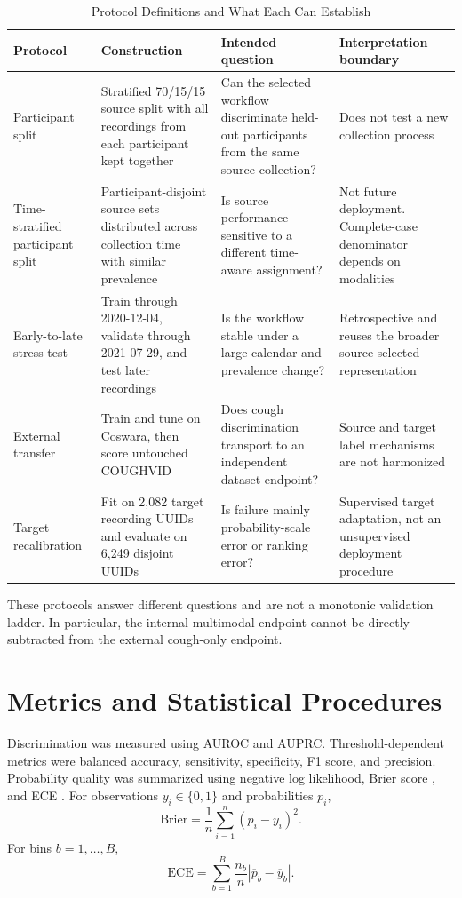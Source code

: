 \documentclass[journal]{IEEEtran}
\newcommand{\ece}{\mathrm{ECE}}
\begin{document}
\begin{table}[t]
\caption{Protocol Definitions and What Each Can Establish}
\label{tab:s_protocols}
\centering
\footnotesize
\begin{tabular}{L{2.6cm}L{3.7cm}L{3.4cm}L{3.8cm}}
\toprule
Protocol & Construction & Intended question & Interpretation boundary \\
\midrule
Participant split & Stratified 70/15/15 source split with all recordings from each participant kept together & Can the selected workflow discriminate held-out participants from the same source collection? & Does not test a new collection process \\
Time-stratified participant split & Participant-disjoint source sets distributed across collection time with similar prevalence & Is source performance sensitive to a different time-aware assignment? & Not future deployment. Complete-case denominator depends on modalities \\
Early-to-late stress test & Train through 2020-12-04, validate through 2021-07-29, and test later recordings & Is the workflow stable under a large calendar and prevalence change? & Retrospective and reuses the broader source-selected representation \\
External transfer & Train and tune on Coswara, then score untouched COUGHVID & Does cough discrimination transport to an independent dataset endpoint? & Source and target label mechanisms are not harmonized \\
Target recalibration & Fit on 2,082 target recording UUIDs and evaluate on 6,249 disjoint UUIDs & Is failure mainly probability-scale error or ranking error? & Supervised target adaptation, not an unsupervised deployment procedure \\
\bottomrule
\end{tabular}
\end{table}

These protocols answer different questions and are not a monotonic validation ladder. In particular, the internal multimodal endpoint cannot be directly subtracted from the external cough-only endpoint.

\section{Metrics and Statistical Procedures}

Discrimination was measured using AUROC and AUPRC. Threshold-dependent metrics were balanced accuracy, sensitivity, specificity, F1 score, and precision. Probability quality was summarized using negative log likelihood, Brier score \cite{brier1950verification}, and ECE \cite{vancalster2019calibration}. For observations $y_i\in\{0,1\}$ and probabilities $p_i$,
\begin{equation}
\mathrm{Brier}=\frac{1}{n}\sum_{i=1}^{n}(p_i-y_i)^2.
\end{equation}
For bins $b=1,\ldots,B$,
\begin{equation}
\ece=\sum_{b=1}^{B}\frac{n_b}{n}\left|\overline p_b-\overline y_b\right|.
\end{equation}
\end{document}
